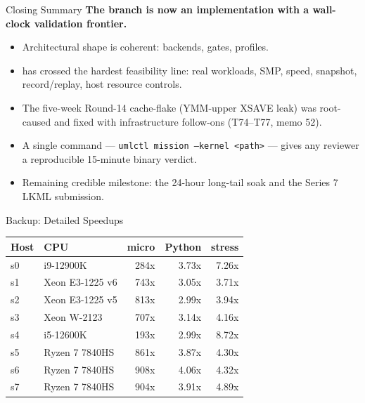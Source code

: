\documentclass[aspectratio=169,11pt]{beamer}
\begin{document}
\begin{frame}{Closing Summary}
\Large
\textbf{The branch is now an implementation with a wall-clock validation frontier.}

\vspace{0.6em}
\normalsize
\begin{itemize}
  \item Architectural shape is coherent: backends, gates, profiles.
  \item \KVMvTwo{} has crossed the hardest feasibility line: real workloads, SMP, speed, snapshot, record/replay, host resource controls.
  \item The five-week Round-14 cache-flake (YMM-upper XSAVE leak) was root-caused and fixed with infrastructure follow-ons (T74--T77, memo 52).
  \item A single command --- \texttt{umlctl mission --kernel <path>} --- gives any reviewer a reproducible 15-minute binary verdict.
  \item Remaining credible milestone: the 24-hour long-tail soak and the Series 7 LKML submission.
\end{itemize}
\end{frame}

\appendix

\begin{frame}{Backup: Detailed Speedups}
\scriptsize
\begin{tabular}{@{}llrrr@{}}
\toprule
Host & CPU & micro & Python & stress \\
\midrule
s0 & i9-12900K & 284x & 3.73x & 7.26x \\
s1 & Xeon E3-1225 v6 & 743x & 3.05x & 3.71x \\
s2 & Xeon E3-1225 v5 & 813x & 2.99x & 3.94x \\
s3 & Xeon W-2123 & 707x & 3.14x & 4.16x \\
s4 & i5-12600K & 193x & 2.99x & 8.72x \\
s5 & Ryzen 7 7840HS & 861x & 3.87x & 4.30x \\
s6 & Ryzen 7 7840HS & 908x & 4.06x & 4.32x \\
s7 & Ryzen 7 7840HS & 904x & 3.91x & 4.89x \\
\bottomrule
\end{tabular}
\end{frame}
\end{document}

